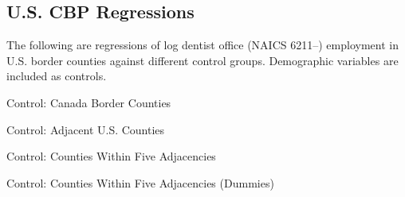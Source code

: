 \subsection{U.S. CBP Regressions}
The following are regressions of log dentist office (NAICS 6211--) employment in U.S. border counties against different control groups.
Demographic variables are included as controls.

\begin{table}[H]
	\caption{Control: Canada Border Counties}
	\centering

\end{table}

\begin{table}[H]
	\caption{Control: Adjacent U.S. Counties}
	\centering

\end{table}

\begin{table}[H]
	\caption{Control: Counties Within Five Adjacencies}
	\centering

\end{table}

\begin{table}[H]
	\caption{Control: Counties Within Five Adjacencies (Dummies)}
	\centering

\end{table}
